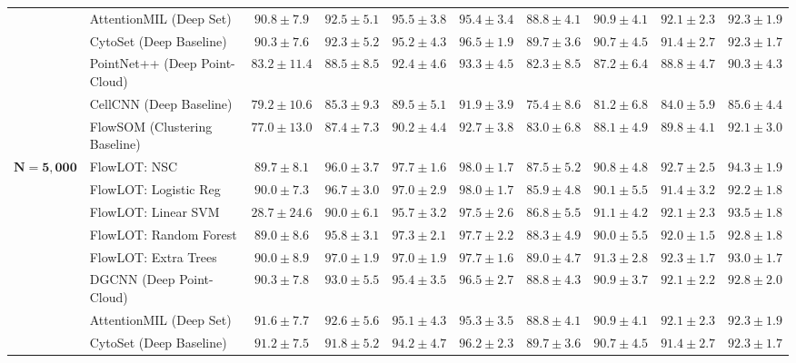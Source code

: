 \documentclass[10pt]{article}
\begin{document}
\begin{table}[p]
\begin{tabular}{ll cccc cccc}
 & AttentionMIL (Deep Set) & $90.8 \pm 7.9$ & $92.5 \pm 5.1$ & $95.5 \pm 3.8$ & $95.4 \pm 3.4$ & $88.8 \pm 4.1$ & $90.9 \pm 4.1$ & $92.1 \pm 2.3$ & $92.3 \pm 1.9$ \\
 & CytoSet (Deep Baseline) & $90.3 \pm 7.6$ & $92.3 \pm 5.2$ & $95.2 \pm 4.3$ & $96.5 \pm 1.9$ & $\mathbf{89.7 \pm 3.6}$ & $90.7 \pm 4.5$ & $91.4 \pm 2.7$ & $92.3 \pm 1.7$ \\
 & PointNet++ (Deep Point-Cloud) & $83.2 \pm 11.4$ & $88.5 \pm 8.5$ & $92.4 \pm 4.6$ & $93.3 \pm 4.5$ & $82.3 \pm 8.5$ & $87.2 \pm 6.4$ & $88.8 \pm 4.7$ & $90.3 \pm 4.3$ \\
 & CellCNN (Deep Baseline) & $79.2 \pm 10.6$ & $85.3 \pm 9.3$ & $89.5 \pm 5.1$ & $91.9 \pm 3.9$ & $75.4 \pm 8.6$ & $81.2 \pm 6.8$ & $84.0 \pm 5.9$ & $85.6 \pm 4.4$ \\
 & FlowSOM (Clustering Baseline) & $77.0 \pm 13.0$ & $87.4 \pm 7.3$ & $90.2 \pm 4.4$ & $92.7 \pm 3.8$ & $83.0 \pm 6.8$ & $88.1 \pm 4.9$ & $89.8 \pm 4.1$ & $92.1 \pm 3.0$ \\
\midrule
\multirow{11}{*}{$\mathbf{N = 5,000}$} & FlowLOT: NSC & $89.7 \pm 8.1$ & $96.0 \pm 3.7$ & $\mathbf{97.7 \pm 1.6}$ & $\mathbf{98.0 \pm 1.7}$ & $87.5 \pm 5.2$ & $90.8 \pm 4.8$ & $\mathbf{92.7 \pm 2.5}$ & $\mathbf{94.3 \pm 1.9}$ \\
 & FlowLOT: Logistic Reg & $90.0 \pm 7.3$ & $96.7 \pm 3.0$ & $97.0 \pm 2.9$ & $\mathbf{98.0 \pm 1.7}$ & $85.9 \pm 4.8$ & $90.1 \pm 5.5$ & $91.4 \pm 3.2$ & $92.2 \pm 1.8$ \\
 & FlowLOT: Linear SVM & $28.7 \pm 24.6$ & $90.0 \pm 6.1$ & $95.7 \pm 3.2$ & $97.5 \pm 2.6$ & $86.8 \pm 5.5$ & $91.1 \pm 4.2$ & $92.1 \pm 2.3$ & $93.5 \pm 1.8$ \\
 & FlowLOT: Random Forest & $89.0 \pm 8.6$ & $95.8 \pm 3.1$ & $97.3 \pm 2.1$ & $97.7 \pm 2.2$ & $88.3 \pm 4.9$ & $90.0 \pm 5.5$ & $92.0 \pm 1.5$ & $92.8 \pm 1.8$ \\
 & FlowLOT: Extra Trees & $90.0 \pm 8.9$ & $\mathbf{97.0 \pm 1.9}$ & $97.0 \pm 1.9$ & $97.7 \pm 1.6$ & $89.0 \pm 4.7$ & $\mathbf{91.3 \pm 2.8}$ & $92.3 \pm 1.7$ & $93.0 \pm 1.7$ \\
 & DGCNN (Deep Point-Cloud) & $90.3 \pm 7.8$ & $93.0 \pm 5.5$ & $95.4 \pm 3.5$ & $96.5 \pm 2.7$ & $88.8 \pm 4.3$ & $90.9 \pm 3.7$ & $92.1 \pm 2.2$ & $92.8 \pm 2.0$ \\
 & AttentionMIL (Deep Set) & $\mathbf{91.6 \pm 7.7}$ & $92.6 \pm 5.6$ & $95.1 \pm 4.3$ & $95.3 \pm 3.5$ & $88.8 \pm 4.1$ & $90.9 \pm 4.1$ & $92.1 \pm 2.3$ & $92.3 \pm 1.9$ \\
 & CytoSet (Deep Baseline) & $91.2 \pm 7.5$ & $91.8 \pm 5.2$ & $94.2 \pm 4.7$ & $96.2 \pm 2.3$ & $\mathbf{89.7 \pm 3.6}$ & $90.7 \pm 4.5$ & $91.4 \pm 2.7$ & $92.3 \pm 1.7$ \\

\end{tabular}
\end{table}
\end{document}
